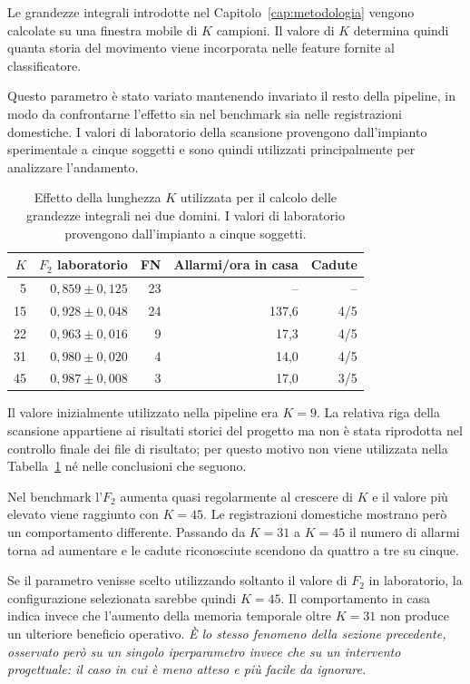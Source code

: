 Le grandezze integrali introdotte nel Capitolo~\ref{cap:metodologia} vengono calcolate su una finestra mobile di $K$ campioni. Il valore di $K$ determina quindi quanta storia del movimento viene incorporata nelle feature fornite al classificatore.

Questo parametro è stato variato mantenendo invariato il resto della pipeline, in modo da confrontarne l'effetto sia nel benchmark sia nelle registrazioni domestiche. I valori di laboratorio della scansione provengono dall'impianto sperimentale a cinque soggetti e sono quindi utilizzati principalmente per analizzare l'andamento.

\begin{table}[ht]
\centering
\caption{Effetto della lunghezza $K$ utilizzata per il calcolo delle
grandezze integrali nei due domini. I valori di laboratorio provengono
dall'impianto a cinque soggetti.}
\label{tab:kappa}
\begin{tabular}{rrrrr}
\toprule
$K$ &
\textbf{$F_2$ laboratorio} &
\textbf{FN} &
\textbf{Allarmi/ora in casa} &
\textbf{Cadute} \\
\midrule
5  & $0{,}859\pm0{,}125$ & 23 & --    & -- \\
15 & $0{,}928\pm0{,}048$ & 24 & 137,6 & 4/5 \\
22 & $0{,}963\pm0{,}016$ & 9  & 17,3  & 4/5 \\
31 & $0{,}980\pm0{,}020$ & 4  & 14,0  & 4/5 \\
45 & $0{,}987\pm0{,}008$ & 3  & 17,0  & 3/5 \\
\bottomrule
\end{tabular}
\end{table}

Il valore inizialmente utilizzato nella pipeline era $K=9$. La relativa riga della scansione appartiene ai risultati storici del progetto ma non è stata riprodotta nel controllo finale dei file di risultato; per questo motivo non viene utilizzata nella Tabella~\ref{tab:kappa} né nelle conclusioni che seguono.

Nel benchmark l'$F_2$ aumenta quasi regolarmente al crescere di $K$ e il valore più elevato viene raggiunto con $K=45$. Le registrazioni domestiche mostrano però un comportamento differente. Passando da $K=31$ a $K=45$ il numero di allarmi torna ad aumentare e le cadute riconosciute scendono da quattro a tre su cinque.

Se il parametro venisse scelto utilizzando soltanto il valore di $F_2$ in laboratorio, la configurazione selezionata sarebbe quindi $K=45$. Il comportamento in casa indica invece che l'aumento della memoria temporale oltre $K=31$ non produce un ulteriore beneficio operativo. \emph{È lo stesso fenomeno della sezione precedente, osservato però su un singolo iperparametro invece che su un intervento progettuale: il caso in cui è meno atteso e più facile da ignorare.}

